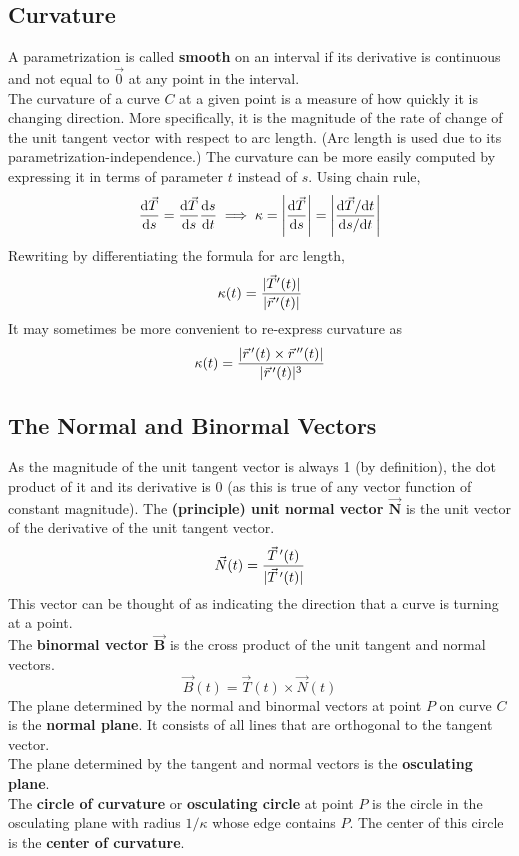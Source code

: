 \documentclass[../Calculus_\Roman{3}]{subfiles}
\begin{document}
			\subsection*{Curvature}
				A parametrization is called \textbf{smooth} on an interval if its derivative is continuous and not equal to $\vec{0}$ at any point in the interval. \\
				The curvature of a curve $C$ at a given point is a measure of how quickly it is changing direction. More specifically, it is the magnitude of the rate of change of the unit tangent vector with respect to arc length. (Arc length is used due to its parametrization-independence.)
				The curvature can be more easily computed by expressing it in terms of parameter $t$ instead of $s$. Using chain rule, 
					\[
						\frac{\mathrm{d} \vec{T}}{\mathrm{d} s} = \frac{\mathrm{d} \vec{T}}{\mathrm{d} s}\frac{\mathrm{d} s}{\mathrm{d} t}
							\implies \kappa
							= \left|\frac{\mathrm{d} \vec{T}}{\mathrm{d} s}\right|
							= \left|{\frac{\mathrm{d} \vec{T} / \mathrm{d} t}{\mathrm{d} s / \mathrm{d} t}}\right|
					\]
				Rewriting by differentiating the formula for arc length, 
					\[\kappa(t) = \frac{|\vec{T}'(t)|}{|\vec{r}\hspace{0.5mm}'(t)|}\]
				It may sometimes be more convenient to re-express curvature as
					\[\kappa(t) = \frac{|\vec{r}\hspace{0.5mm}'(t) \times \vec{r}\hspace{0.5mm}''(t)|}{|\vec{r}\hspace{0.5mm}'(t)|^3}\]
			\subsection*{The Normal and Binormal Vectors}
				As the magnitude of the unit tangent vector is always 1 (by definition), the dot product of it and its derivative is 0 (as this is true of any vector function of constant magnitude). The \textbf{(principle) unit normal vector $\bm{\vec{N}}$} is the unit vector of the derivative of the unit tangent vector.
					\[\vec{N}(t) = \frac{\vec{T}\hspace{0.5mm}'(t)}{|\vec{T}\hspace{0.5mm}'(t)|}\]
				This vector can be thought of as indicating the direction that a curve is turning at a point. \\
				The \textbf{binormal vector $\bm{\vec{B}}$} is the cross product of the unit tangent and normal vectors.
					\[\vec{B}(t) = \vec{T}(t) \times \vec{N}(t)\]
				The plane determined by the normal and binormal vectors at point $P$ on curve $C$ is the \textbf{normal plane}. It consists of all lines that are orthogonal to the tangent vector. \\
				The plane determined by the tangent and normal vectors is the \textbf{osculating plane}. \\
				The \textbf{circle of curvature} or \textbf{osculating circle} at point $P$ is the circle in the osculating plane with radius $1/\kappa$ whose edge contains $P$. The center of this circle is the \textbf{center of curvature}.
\end{document}
